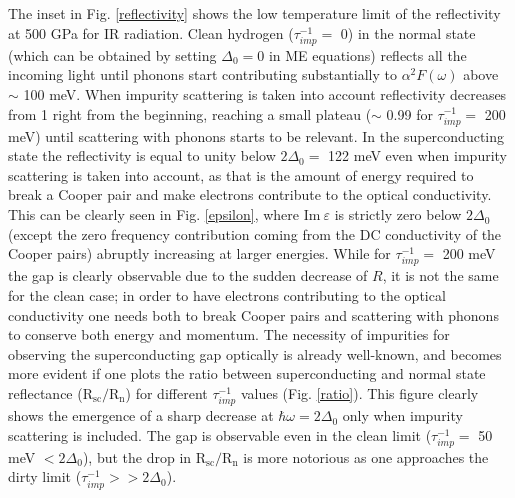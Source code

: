 \documentclass[%
 reprint,
superscriptaddress,
 amsmath,amssymb,
 aps,
prb,
floatfix,
]{revtex4-1}
\begin{document}
The inset in Fig. \ref{reflectivity} shows the low temperature limit of the reflectivity 
at 500 GPa for IR radiation. Clean hydrogen ($\tau_{imp}^{-1}=$ 0)  in the normal 
state (which can be obtained by setting $\Delta_0=0$ in ME equations) reflects 
all the incoming light until phonons start
contributing substantially to $\alpha^2F(\omega)$ above $\sim$ 100 meV. When impurity 
scattering is taken into account reflectivity decreases from 1 right from the 
beginning, reaching a small plateau ($\sim$ 0.99 for $\tau_{imp}^{-1}=$ 200 meV)
until scattering with phonons starts to be relevant. In the superconducting state the reflectivity
is equal to unity below $2\Delta_0=$ 122 meV even when impurity scattering is taken into account, 
as that is the amount of energy required to break a 
Cooper pair and make electrons contribute
to the optical conductivity. This can be clearly seen in 
Fig. \ref{epsilon}, where $\text{Im}~\varepsilon$ is strictly zero
below $2\Delta_0$ (except the zero frequency contribution coming from the 
DC conductivity of the Cooper pairs) abruptly
increasing at larger energies. While for $\tau_{imp}^{-1}=$ 200 meV the gap is 
clearly observable due to the sudden decrease of $R$, it is not the same 
for the clean case; in order to have electrons contributing 
to the optical conductivity one needs both 
to break Cooper pairs and scattering with phonons to conserve both 
energy and momentum. The necessity of impurities for observing the 
superconducting gap optically is already well-known, and becomes more 
evident if one plots the ratio between superconducting
and normal state reflectance ($\mathrm{R_{sc}/R_n}$) for different 
$\tau_{imp}^{-1}$ values (Fig. \ref{ratio}). This figure clearly shows 
the emergence of a sharp decrease at $\hbar\omega=2\Delta_0$ only when
impurity scattering is included. The gap is observable even in the clean 
limit ($\tau_{imp}^{-1}=$ 50 meV $<2\Delta_0$), but the drop 
in $\mathrm{R_{sc}/R_n}$ is more notorious as one approaches 
the dirty limit ($\tau_{imp}^{-1}>>2\Delta_0$).
\end{document}

